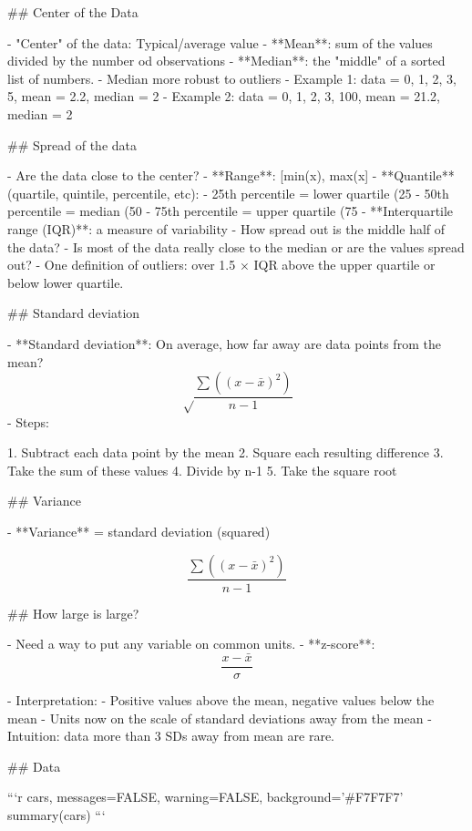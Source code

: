 ## Center of the Data

- "Center" of the data: Typical/average value
- **Mean**: sum of the values divided by the number od observations
- **Median**: the "middle" of a sorted list of numbers.
- Median more robust to outliers
  - Example 1: data = {0, 1, 2, 3, 5}, mean = 2.2, median = 2
  - Example 2: data = {0, 1, 2, 3, 100}, mean = 21.2, median = 2
  
## Spread of the data

- Are the data close to the center?
- **Range**: [min(x), max(x]
- **Quantile** (quartile, quintile, percentile, etc):
  - 25th percentile = lower quartile (25%
  - 50th percentile = median (50%
  - 75th percentile = upper quartile (75%
- **Interquartile range (IQR)**: a measure of variability
  - How spread out is the middle half of the data?
  - Is most of the data really close to the median or are the values spread out?
- One definition of outliers: over 1.5 × IQR above the upper quartile or below
lower quartile.

## Standard deviation

- **Standard deviation**: On average, how far away are data points from the
mean?
$$\sqrt\frac{\sum((x - \bar{x})^{2})}{n-1}$$
- Steps:

  1. Subtract each data point by the mean
  2. Square each resulting difference
  3. Take the sum of these values
  4. Divide by n-1
  5. Take the square root

## Variance

- **Variance** = standard deviation (squared)

$$\frac{\sum((x - \bar{x})^{2})}{n-1}$$

## How large is large?

- Need a way to put any variable on common units.
-  **z-score**: $$\frac{x - \bar{x}}{\sigma}$$

- Interpretation:
  - Positive values above the mean, negative values below the mean
  - Units now on the scale of standard deviations away from the mean
  - Intuition: data more than 3 SDs away from mean are rare.
  
## Data

```{r cars, messages=FALSE, warning=FALSE, background='#F7F7F7'}
summary(cars)
```
